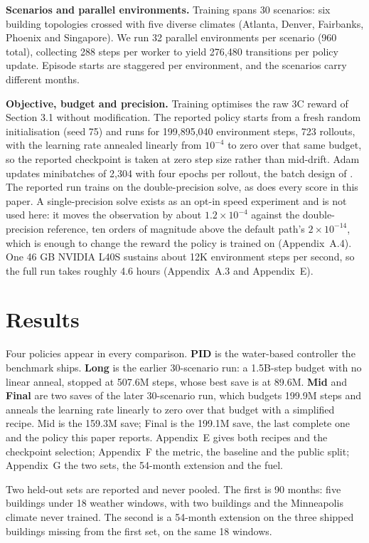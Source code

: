 \documentclass{article}
\begin{document}
\textbf{Scenarios and parallel environments.} Training spans 30 scenarios: six building topologies crossed with five diverse climates (Atlanta, Denver, Fairbanks, Phoenix and Singapore). We run 32 parallel environments per scenario (960 total), collecting 288 steps per worker to yield 276,480 transitions per policy update. Episode starts are staggered per environment, and the scenarios carry different months.

\textbf{Objective, budget and precision.} Training optimises the raw 3C reward of Section 3.1 without modification. The reported policy starts from a fresh random initialisation (seed 75) and runs for 199,895,040 environment steps, 723 rollouts, with the learning rate annealed linearly from $10^{-4}$ to zero over that same budget, so the reported checkpoint is taken at zero step size rather than mid-drift. Adam \citep{kingma2015adam} updates minibatches of 2,304 with four epochs per rollout, the batch design of \citet{andrychowicz2020matters}. The reported run trains on the double-precision solve, as does every score in this paper. A single-precision solve exists as an opt-in speed experiment and is not used here: it moves the observation by about $1.2\times10^{-4}$ against the double-precision reference, ten orders of magnitude above the default path's $2\times10^{-14}$, which is enough to change the reward the policy is trained on (Appendix~A.4). One 46 GB NVIDIA L40S sustains about 12K environment steps per second, so the full run takes roughly 4.6 hours (Appendix~A.3 and Appendix~E).

\section{Results}

Four policies appear in every comparison. \textbf{PID} is the water-based controller the benchmark ships. \textbf{Long} is the earlier 30-scenario run: a 1.5B-step budget with no linear anneal, stopped at 507.6M steps, whose best save is at 89.6M. \textbf{Mid} and \textbf{Final} are two saves of the later 30-scenario run, which budgets 199.9M steps and anneals the learning rate linearly to zero over that budget with a simplified recipe. Mid is the 159.3M save; Final is the 199.1M save, the last complete one and the policy this paper reports. Appendix~E gives both recipes and the checkpoint selection; Appendix~F the metric, the baseline and the public split; Appendix~G the two sets, the 54-month extension and the fuel.

Two held-out sets are reported and never pooled. The first is 90 months: five buildings under 18 weather windows, with two buildings and the Minneapolis climate never trained. The second is a 54-month extension on the three shipped buildings missing from the first set, on the same 18 windows.
\end{document}
